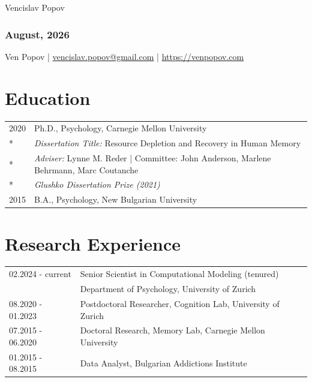 \documentclass[letterpaper]{article}
\def\name{Vencislav Popov}
\begin{document}
{\huge \name}

\subsubsection*{August, 2026}
\begin{minipage}{0.80\linewidth}
  Ven Popov  | \href{mailto:vencislav.popov@gmail.com}{vencislav.popov@gmail.com} | \url{https://venpopov.com} \\
\end{minipage}

\section*{Education}

\begin{tabular}{ll}
  2020 & Ph.D., Psychology, Carnegie Mellon University                                              \\*
  & {\it Dissertation Title:}  Resource Depletion and Recovery in Human Memory                 \\*
  & {\it Adviser:} Lynne M. Reder | Committee: John Anderson, Marlene Behrmann, Marc Coutanche \\*
  & {\it Glushko Dissertation Prize (2021)}                                                    \\[6pt]
  2015 & B.A., Psychology, New Bulgarian University                                                 \\
\end{tabular}

\section*{Research Experience}

\begin{tabular}{ll}
  02.2024 - current & Senior Scientist in Computational Modeling (tenured)         \\
  & Department of Psychology, University of Zurich               \\[6pt]
  08.2020 - 01.2023 & Postdoctoral Researcher, Cognition Lab, University of Zurich \\[6pt]
  07.2015 - 06.2020 & Doctoral Research, Memory Lab, Carnegie Mellon University    \\[6pt]
  01.2015 - 08.2015 & Data Analyst, Bulgarian Addictions Institute                 \\
\end{tabular}
\end{document}
